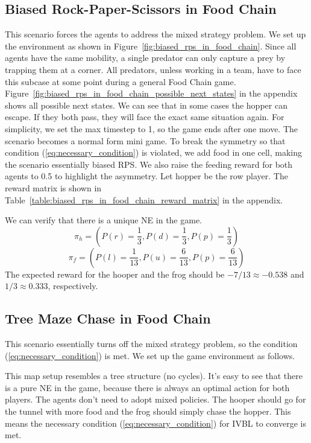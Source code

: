 \documentclass[]{interact}
\theoremstyle{plain}%
\theoremstyle{definition}
\theoremstyle{remark}
\begin{document}
\subsection{Biased Rock-Paper-Scissors in Food Chain}
This scenario forces the agents to address the mixed strategy problem. We set up the environment as shown in Figure~\ref{fig:biased_rps_in_food_chain}. Since all agents have the same mobility, a single predator can only capture a prey by trapping them at a corner. All predators, unless working in a team, have to face this subcase at some point during a general Food Chain game. Figure~\ref{fig:biased_rps_in_food_chain_possible_next_states} in the appendix shows all possible next states. We can see that in some cases the hopper can escape. If they both pass, they will face the exact same situation again. For simplicity, we set the max timestep to 1, so the game ends after one move. The scenario becomes a normal form mini game. To break the symmetry so that condition (\ref{eq:necessary_condition}) is violated, we add food in one cell, making the scenario essentially biased RPS. We also raise the feeding reward for both agents to 0.5 to highlight the asymmetry. Let hopper be the row player. The reward matrix is shown in Table~\ref{table:biased_rps_in_food_chain_reward_matrix} in the appendix.

We can verify that there is a unique NE in the game.
\begin{equation}
    \pi_h=(P(r)=\frac{1}{3},P(d)=\frac{1}{3},P(p)=\frac{1}{3})
    \label{eq:biased_rps_in_food_chain_hopper_policy}
\end{equation}
\begin{equation}
    \pi_f=(P(l)=\frac{1}{13},P(u)=\frac{6}{13},P(p)=\frac{6}{13})
    \label{eq:biased_rps_in_food_chain_frog_policy}
\end{equation}
The expected reward for the hooper and the frog should be $-7/13 \approx -0.538$ and $1/3 \approx 0.333$, respectively.

\subsection{Tree Maze Chase in Food Chain}
This scenario essentially turns off the mixed strategy problem, so the condition (\ref{eq:necessary_condition}) is met. We set up the game environment as follows.

This map setup resembles a tree structure (no cycles). It's easy to see that there is a pure NE in the game, because there is always an optimal action for both players. The agents don't need to adopt mixed policies. The hooper should go for the tunnel with more food and the frog should simply chase the hopper. This means the necessary condition (\ref{eq:necessary_condition}) for IVBL to converge is met.
\end{document}
